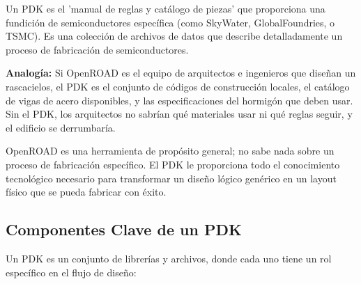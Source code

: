\documentclass[12pt,a4paper]{article}
\begin{document}
Un PDK es el 'manual de reglas y catálogo de piezas' que proporciona una fundición de semiconductores específica (como SkyWater, GlobalFoundries, o TSMC). Es una colección de archivos de datos que describe detalladamente un proceso de fabricación de semiconductores.

\textbf{Analogía:} Si OpenROAD es el equipo de arquitectos e ingenieros que diseñan un rascacielos, el PDK es el conjunto de códigos de construcción locales, el catálogo de vigas de acero disponibles, y las especificaciones del hormigón que deben usar. Sin el PDK, los arquitectos no sabrían qué materiales usar ni qué reglas seguir, y el edificio se derrumbaría.

OpenROAD es una herramienta de propósito general; no sabe nada sobre un proceso de fabricación específico. El PDK le proporciona todo el conocimiento tecnológico necesario para transformar un diseño lógico genérico en un layout físico que se pueda fabricar con éxito.

\subsection{Componentes Clave de un PDK}

Un PDK es un conjunto de librerías y archivos, donde cada uno tiene un rol específico en el flujo de diseño:
\end{document}

